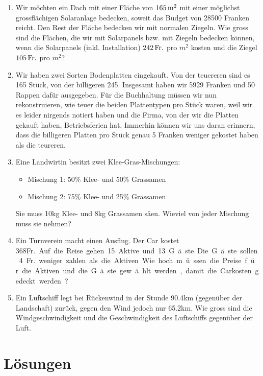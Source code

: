 \documentclass[%
11pt,%
twoside,%
titlepage,%
german,%
]{scrartcl}
\begin{document}
\begin{enumerate}
\begin{enumerate}
  \item Wir m\"ochten ein Dach mit einer Fl\"ache von $\unit[165]{m^2}$ mit einer m\"oglichst grossfl\"achigen Solaranlage bedecken, soweit das Budget von 28500 Franken reicht. Den Rest der Fl\"ache bedecken wir mit normalen Ziegeln. Wie gross sind die Fl\"achen, die wir mit Solarpanels bzw. mit Ziegeln bedecken k\"onnen, wenn die Solarpanels (inkl. Installation) $\unit[242]{Fr.}$ pro $\unit{m^2}$ kosten und die Ziegel $\unit[105]{Fr.}$ pro $\unit{m^2}$?
    
  \item Wir haben zwei Sorten Bodenplatten eingekauft. Von der teuereren sind es 165 St\"uck, von der billigeren 245. Insgesamt haben wir 5929 Franken und 50 Rappen daf\"ur ausgegeben. F\"ur die Buchhaltung m\"ussen wir nun rekonstruieren, wie teuer die beiden Plattentypen pro St\"uck waren, weil wir es leider nirgends notiert haben und die Firma, von der wir die Platten gekauft haben, Betriebsferien hat. Immerhin k\"onnen wir uns daran erinnern, dass die billigeren Platten pro St\"uck genau 5 Franken weniger gekostet haben als die teureren.

\item Eine Landwirtin besitzt zwei Klee-Gras-Mischungen:
  \begin{itemize}
  \item Mischung 1: 50\% Klee- und 50\% Grassamen
  \item Mischung 2: 75\% Klee- und 25\% Grassamen
  \end{itemize}
  Sie muss 10\unit{kg} Klee- und 8\unit{kg} Grassamen s\"aen. Wieviel von jeder Mischung muss sie nehmen?

\item Ein Turnverein macht einen Ausflug. Der Car kostet 368\unit{Fr.} Auf die Reise gehen 15 Aktive und 13 G\"aste. Die G\"aste sollen 4\unit{Fr.} weniger zahlen als die Aktiven. Wie hoch m\"ussen die Preise f\"ur die Aktiven und die G\"aste gew\"ahlt werden, damit die Carkosten gedeckt werden?

\item Ein Luftschiff legt bei R\"uckenwind in der Stunde 90.4\unit{km} (gegen\"uber der Landschaft) zur\"uck, gegen den Wind jedoch nur 65.2\unit{km}. Wie gross sind die Windgeschwindigkeit und die Geschwindigkeit des Luftschiffs gegen\"uber der Luft.
\end{enumerate}

\end{enumerate}


\section*{L\"osungen}
\end{document}
